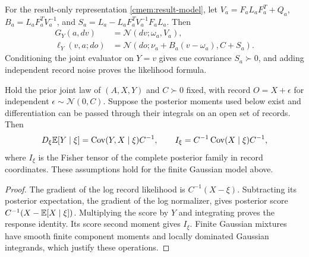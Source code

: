 For the result-only representation \cref{cmem:result-model}, let $V_a=F_aL_aF_a^T+Q_a$, $B_a=L_aF_a^TV_a^{-1}$, and $S_a=L_a-L_aF_a^TV_a^{-1}F_aL_a$. Then
\begin{equation}
 \begin{aligned}
 G_Y(a,dv)&=\mathcal N(dv;\omega_a,V_a),\\
 \ell_Y(v,a;do)&=\mathcal N(do;\nu_a+B_a(v-\omega_a),C+S_a).
 \end{aligned}
 \label{cmem:result-only-gaussian}
\end{equation}
Conditioning the joint evaluator on $Y=v$ gives cue covariance $S_a\succ0$, and adding independent record noise proves the likelihood formula.

Hold the prior joint law of $(A,X,Y)$ and $C\succ0$ fixed, with record $O=X+\epsilon$ for independent $\epsilon\sim\mathcal N(0,C)$. Suppose the posterior moments used below exist and differentiation can be passed through their integrals on an open set of records. Then
\begin{equation}
 D_\xi\mathbb E[Y\mid\xi]=\operatorname{Cov}(Y,X\mid\xi)C^{-1},\qquad
 I_\xi=C^{-1}\operatorname{Cov}(X\mid\xi)C^{-1},
 \label{cmem:response-fisher}
\end{equation}
where $I_\xi$ is the Fisher tensor of the complete posterior family in record coordinates. These assumptions hold for the finite Gaussian model above.
\begin{proof}
The gradient of the log record likelihood is $C^{-1}(X-\xi)$. Subtracting its posterior expectation, the gradient of the log normalizer, gives posterior score $C^{-1}(X-\mathbb E[X\mid\xi])$. Multiplying the score by $Y$ and integrating proves the response identity. Its score second moment gives $I_\xi$. Finite Gaussian mixtures have smooth finite component moments and locally dominated Gaussian integrands, which justify these operations.
\end{proof}

